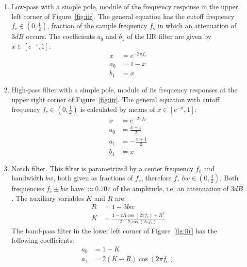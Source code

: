 \begin{enumerate}
  \item Low-pass with a simple pole, module of the frequency response in the upper left corner of Figure~\ref{fig:iir}. The general equation has the cutoff frequency $f_c \in (0,\frac{1}{2})$, fraction of the sample frequency $f_s$ in which an attenuation of $3dB$ occurs. The coefficients $a_0$ and $b_1$ of the IIR filter are given by $x \in [e^{-\pi},1]$:
\begin{equation}\label{eq:passa-baixas}
 \begin{split}
 x & =e^{-2\pi f_c} \\
 a_0 & =  1-x \\
 b_1 & =  x
 \end{split}
\end{equation}
  \item High-pass filter with a simple pole, module of its frequency responses at the upper right corner of Figure~\ref{fig:iir}. The general equation with cutoff frequency $f_c \in (0,\frac{1}{2})$ is calculated by means of $x \in [e^{-\pi},1]$:
\begin{equation}\label{eq:passa-altas}
 \begin{split}
 x & =e^{-2\pi f_c} \\
 a_0 & =  \frac{x+1}{2} \\
 a_1 & =  -\frac{x+1}{2} \\
 b_1 & =  x
 \end{split}
\end{equation}
\item Notch filter.
This filter is parametrized by a center frequency $f_c$ and bandwidth $bw$, both given as fractions of $f_s$, therefore $f,\; bw \in (0,\frac{1}{2})$.
Both frequencies $f_c \pm bw$ have $\approx 0.707$ of the amplitude, i.e.
an attenuation of $3dB$.
The auxiliary variables $K$ and $R$ are:
\begin{equation}\label{eq:varAux}
 \begin{split}
  R & = 1 - 3bw \\
  K & = \frac{1-2R\cos(2\pi f_c) + R^2}{2 - 2 \cos (2 \pi f_c)}
 \end{split}
\end{equation}
The band-pass filter in the lower left corner of Figure~\ref{fig:iir} has the following coefficients:
\begin{equation}\label{eq:passa-banda}
 \begin{split}
 a_0 & =  1 - K \\
 a_1 & =  2(K-R)\cos (2\pi f_c) \\

\end{split}
\end{equation}
\end{enumerate}

